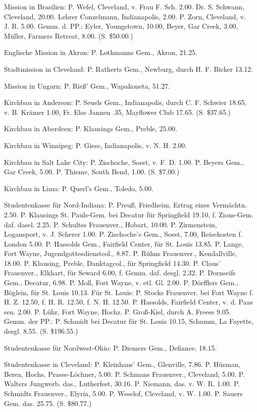 Mission in Brasilien: P. Wefel, Cleveland, v. Frau F. Sch. 2.00. Dr. S. Schwann, Cleveland, 20.00. Lehrer Conzelmann, Indianapolis, 2.00. P. Zorn, Cleveland, v. J. R. 5.00. Gemm. d. PP.: Eyler, Youngstown, 10.00, Beyer, Gar Creek, 3.00, Müller, Farmers Retreat, 8.00. (S. \$50.00.)

Englische Mission in Akron: P. Lothmanns Gem., Akron, 21.25.

Stadtmission in Cleveland: P. Ratherts Gem., Newburg, durch H. F. Bicker 13.12.

Mission in Ungarn: P. Rieß’ Gem., Wapakoneta, 51.27.

Kirchbau in Anderson: P. Seuels Gem., Indianapolis, durch C. F. Schwier 18.65, v. B. Krämer 1.00, Fr. Else Jannen .35, Mayflower Club 17.65. (S. \$37.65.)

Kirchbau in Aberdeen: P. Klausings Gem., Preble, 25.00.

Kirchbau in Winnipeg: P. Giese, Indianapolis, v. N. H. 2.00.

Kirchbau in Salt Lake City: P. Zischoche, Soest, v. F. D. 1.00. P. Beyers Gem., Gar Creek, 5.00. P. Thieme, South Bend, 1.00. (S. \$7.00.)

Kirchbau in Lima: P. Querl’s Gem., Toledo, 5.00.

Studentenkasse für Nord-Indiana: P. Preuß, Friedheim, Ertrag eines Vermächtn. 2.50. P. Klausings St. Pauls-Gem. bei Decatur für Springfield 19.10, f. Zions-Gem. daf. dasel. 2.25. P. Schultes Frauenver., Hobart, 10.00. P. Zirmenstein, Logansport, v. J. Scherer 1.00. P. Zischoche’s Gem., Soest, 7.00, Reisekosten f. London 5.00. P. Hassolds Gem., Fairfield Center, für St. Louis 13.85. P. Lange, Fort Wayne, Jugendgottesdienstcol., 8.87. P. Rühns Frauenver., Kendallville, 18.00. P. Klausing, Preble, Danktagcol., für Springfield 14.30. P. Claus’ Frauenver., Elkhart, für Seward 6.00, f. Gemm. daf. desgl. 2.32. P. Dornseifs Gem., Decatur, 6.98. P. Moll, Fort Wayne, v. etl. Gl. 2.00. P. Dörfflers Gem., Böglein, für St. Louis 10.13. Für St. Louis: P. Stocks Frauenver. bei Fort Wayne f. H. Z. 12.50, f. H. R. 12.50, f. N. H. 12.50. P. Hassolds, Fairfield Center, v. d. Paas sen. 2.00. P. Lühr, Fort Wayne, Hochz. P. Groß-Kiel, durch A. Freese 9.05. Gemm. der PP.: P. Schmidt bei Decatur für St. Louis 10.15, Schumm, La Fayette, desgl. 8.55. (S. \$196.55.)


Studentenkasse für Nordwest-Ohio: P. Diemers Gem., Defiance, 18.15.

Studentenkasse in Cleveland: P. Kleinhans’ Gem., Glenville, 7.86. P. Hüsman, Berea, Hochs. Prasse-Löchner, 5.00. P. Schmans Frauenver., Cleveland, 5.00. P. Walters Jungwerb. das., Lutherfest, 30.16. P. Niemann, das. v. W. R. 1.00. P. Schmidts Frauenver., Elyria, 5.00. P. Weselof, Cleveland, v. W. 1.00. P. Sauers Gem. das. 25.75. (S. \$80.77.)

